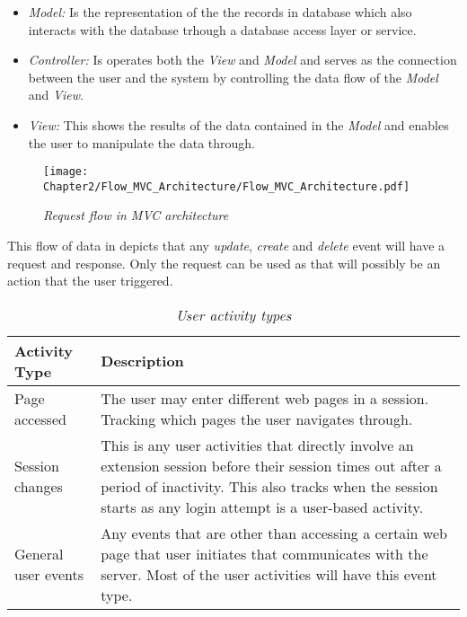 \begin{itemize}
	\item \textit{Model:} Is the representation of the the records in database which also interacts with the database trhough a database access layer or service.
	\item \textit{Controller:} Is operates both the \textit{View} and \textit{Model} and serves as the connection between the user and the system by controlling the data flow of the \textit{Model} and \textit{View}.
	\item \textit{View:} This shows the results of the data contained in the \textit{Model} and enables the user to manipulate the data through.
\end{itemize}

\begin{figure}[!htb] %
	\centering %
	\texttt{[image: Chapter2/Flow\_MVC\_Architecture/Flow\_MVC\_Architecture.pdf]}
	\caption[Request flow in MVC architecture]
	{\textit{Request flow in MVC architecture \cite{Gu2010}}}\label{fig:ch2_flowMVC_Architecture}
\end{figure}

This flow of data in  depicts that any \textit{update}, \textit{create} and \textit{delete} event will have a request and response. Only the request can be used as that will possibly be an action that the user triggered.

\begin{table}[!htb]
	\centering
	\small
	\caption[User activity types]
	{\textit{User activity types}}
	\label{tbl:Ch2_User_ActivityTypes}
	\begin{tabularx}{\textwidth}{|l|X|}
		\hline \textbf{Activity Type} & \textbf{Description} \\
		\hline Page accessed & The user may enter different web pages in a session. Tracking which pages the user navigates through.\\
		\hline Session changes & This is any user activities that directly involve an extension session before their session times out after a period of inactivity. This also tracks when the session starts as any login attempt is a user-based activity.\\
		\hline General user events & Any events that are other than accessing a certain web page that user initiates that communicates with the server. Most of the user activities will have this event type.\\ 
		\hline
	\end{tabularx}
\end{table}


